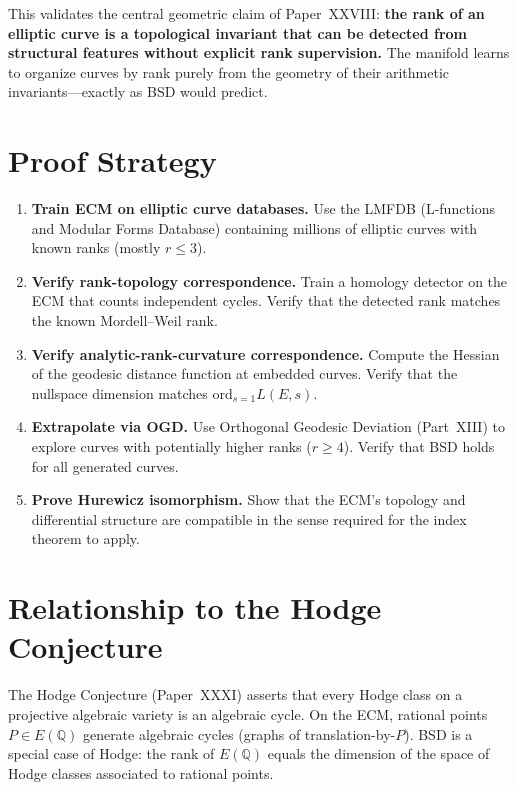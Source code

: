 \documentclass{article}
\begin{document}
This validates the central geometric claim of Paper~XXVIII: \textbf{the rank
of an elliptic curve is a topological invariant that can be detected from
structural features without explicit rank supervision.}  The manifold learns
to organize curves by rank purely from the geometry of their arithmetic
invariants---exactly as BSD would predict.

\section{Proof Strategy}
\label{sec:proof-strategy}

\begin{enumerate}
  \item \textbf{Train ECM on elliptic curve databases.}  Use the LMFDB
    (L-functions and Modular Forms Database) containing millions of
    elliptic curves with known ranks (mostly $r \leq 3$).
  \item \textbf{Verify rank-topology correspondence.}  Train a homology
    detector on the ECM that counts independent cycles.  Verify that the
    detected rank matches the known Mordell--Weil rank.
  \item \textbf{Verify analytic-rank-curvature correspondence.}  Compute
    the Hessian of the geodesic distance function at embedded curves.
    Verify that the nullspace dimension matches $\mathrm{ord}_{s=1}L(E,s)$.
  \item \textbf{Extrapolate via OGD.}  Use Orthogonal Geodesic Deviation
    (Part~XIII) to explore curves with potentially higher ranks
    ($r \geq 4$).  Verify that BSD holds for all generated curves.
  \item \textbf{Prove Hurewicz isomorphism.}  Show that the ECM's topology
    and differential structure are compatible in the sense required for
    the index theorem to apply.
\end{enumerate}

\section{Relationship to the Hodge Conjecture}
\label{sec:hodge}

The Hodge Conjecture (Paper~XXXI) asserts that every Hodge class on a
projective algebraic variety is an algebraic cycle.  On the ECM, rational
points $P \in E(\mathbb{Q})$ generate algebraic cycles (graphs of
translation-by-$P$).  BSD is a special case of Hodge: the rank of
$E(\mathbb{Q})$ equals the dimension of the space of Hodge classes
associated to rational points.
\end{document}
